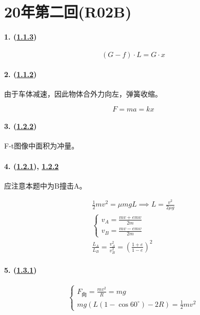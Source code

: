 
\section{20年第二回(R02B)}

\paragraph{1. (\hyperref[subsec:1.1.3]{1.1.3})}

\begin{equation*}
    (G-f)\cdot L=G\cdot x
\end{equation*}

\paragraph{2. (\hyperref[subsec:1.1.2]{1.1.2})} 由于车体减速，因此物体合外力向左，弹簧收缩。

\begin{equation*}
    F=ma=kx
\end{equation*}

\paragraph{3. (\hyperref[subsec:1.2.2]{1.2.2})} F-t图像中面积为冲量。
\paragraph{4. (\hyperref[subsec:1.2.1]{1.2.1}), \hyperref[subsec:1.2.2]{1.2.2}} 应注意本题中为B撞击A。

\begin{gather*}
    \frac12mv^2=\mu mgL\implies L=\frac{v^2}{2\mu g}\\
    \begin{cases}
        v_A=\frac{mv+emv}{2m}\\
        v_B=\frac{mv-emv}{2m}
    \end{cases}\\
    \frac{L_A}{L_B}=\frac{v_A^2}{v_B^2}=\left(\frac{1+e}{1-e}\right)^2
\end{gather*}

\paragraph{5. (\hyperref[subsec:1.3.1]{1.3.1})}

\begin{equation*}
    \begin{cases}
        F_\textrm{向}=\frac{mv^2}{R}=mg\\
        mg(L(1-\cos60^\circ)-2R)=\frac12mv^2
    \end{cases}
\end{equation*}

